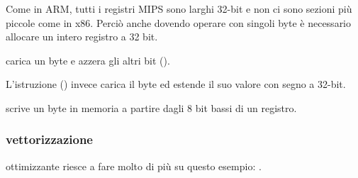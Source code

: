 Come in ARM, tutti i registri MIPS sono larghi 32-bit e non ci sono sezioni più piccole come in x86.
Perciò anche dovendo operare con singoli byte è necessario allocare un intero registro a 32 bit.

 carica un byte e azzera gli altri bit ().

L'istruzione  () invece carica il byte ed estende il suo valore con segno a 32-bit.

 scrive un byte in memoria a partire dagli 8 bit bassi di un registro.

\subsubsection{vettorizzazione}

\GCC ottimizzante riesce a fare molto di più su questo esempio: .
